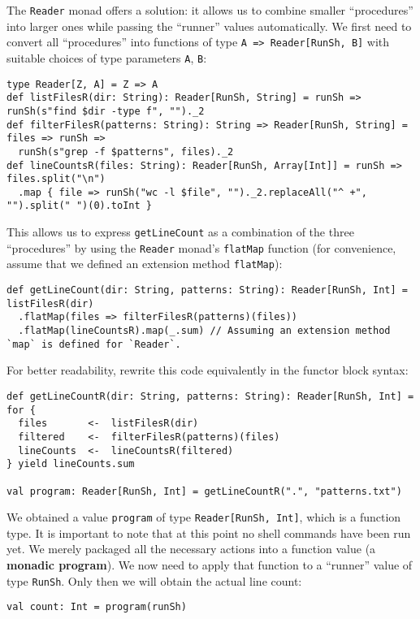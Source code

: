 The \lstinline!Reader! monad offers a solution: it allows us to combine
smaller \textsf{``}procedures\textsf{''} into larger ones while passing the \textsf{``}runner\textsf{''}
values automatically. We first need to convert all \textsf{``}procedures\textsf{''}
into functions of type \lstinline!A => Reader[RunSh, B]! with suitable
choices of type parameters \lstinline!A!, \lstinline!B!:
\begin{lstlisting}
type Reader[Z, A] = Z => A
def listFilesR(dir: String): Reader[RunSh, String] = runSh => runSh(s"find $dir -type f", "")._2
def filterFilesR(patterns: String): String => Reader[RunSh, String] = files => runSh =>
  runSh(s"grep -f $patterns", files)._2
def lineCountsR(files: String): Reader[RunSh, Array[Int]] = runSh => files.split("\n")
  .map { file => runSh("wc -l $file", "")._2.replaceAll("^ +", "").split(" ")(0).toInt }
\end{lstlisting}
 This allows us to express \lstinline!getLineCount! as a combination
of the three \textsf{``}procedures\textsf{''} by using the \lstinline!Reader! monad\textsf{'}s
\lstinline!flatMap! function (for convenience, assume that we defined
an extension method \lstinline!flatMap!):
\begin{lstlisting}
def getLineCount(dir: String, patterns: String): Reader[RunSh, Int] = listFilesR(dir)
  .flatMap(files => filterFilesR(patterns)(files))
  .flatMap(lineCountsR).map(_.sum) // Assuming an extension method `map` is defined for `Reader`.
\end{lstlisting}
For better readability, rewrite this code equivalently in the functor
block syntax:
\begin{lstlisting}
def getLineCountR(dir: String, patterns: String): Reader[RunSh, Int] = for {
  files       <-  listFilesR(dir)
  filtered    <-  filterFilesR(patterns)(files)
  lineCounts  <-  lineCountsR(filtered)
} yield lineCounts.sum

val program: Reader[RunSh, Int] = getLineCountR(".", "patterns.txt") 
\end{lstlisting}
We obtained a value \lstinline!program! of type \lstinline!Reader[RunSh, Int]!,
which is a function type. It is important to note that at this point
no shell commands have been run yet. We merely packaged all the necessary
actions into a function value (a \textbf{monadic program}).
We now need to apply that function to a \textsf{``}runner\textsf{''}
value of type \lstinline!RunSh!. Only then we will obtain the actual
line count:
\begin{lstlisting}
val count: Int = program(runSh)
\end{lstlisting}

